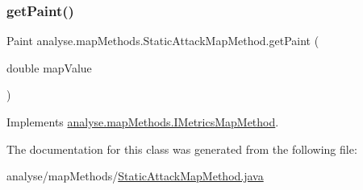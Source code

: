 \subsubsection{\texorpdfstring{get\+Paint()}{getPaint()}}
{\footnotesize\ttfamily Paint analyse.\+map\+Methods.\+Static\+Attack\+Map\+Method.\+get\+Paint (\begin{DoxyParamCaption}\item[{double}]{map\+Value }\end{DoxyParamCaption})\hspace{0.3cm}{\ttfamily [inline]}}



Implements \mbox{\hyperlink{interfaceanalyse_1_1map_methods_1_1_i_metrics_map_method_a102909023c32cebe3bc75052f55b24a0}{analyse.\+map\+Methods.\+I\+Metrics\+Map\+Method}}.



The documentation for this class was generated from the following file\+:\begin{DoxyCompactItemize}
\item 
analyse/map\+Methods/\mbox{\hyperlink{_static_attack_map_method_8java}{Static\+Attack\+Map\+Method.\+java}}\end{DoxyCompactItemize}
